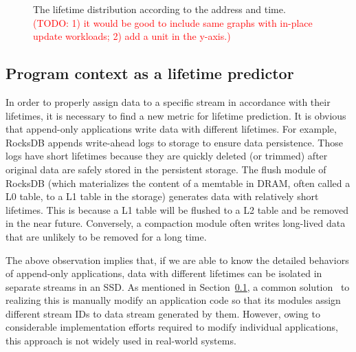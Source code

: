 \begin{figure}[t]
	\centering
	\vspace{-10pt}
	\caption{
		The lifetime distribution according to the address and time.
		\textcolor{red}{(TODO: 1) it would be good to include same graphs with
		in-place update workloads; 2) add a unit in the y-axis.)}}
		\label{fig:lba_lifetime}
	\vspace{-15pt}
\end{figure}

\subsection{Program context as a lifetime predictor}

In order to properly assign data to a specific stream in accordance with their
lifetimes, it is necessary to find a new metric for lifetime prediction.  It is
obvious that append-only applications write data with different lifetimes.  For
example, RocksDB appends write-ahead logs to storage to ensure data
persistence.  Those logs have short lifetimes because they are quickly deleted
(or trimmed) after original data are safely stored in the persistent storage.
The flush module of RocksDB (which materializes the content of a memtable in
DRAM, often called a L0 table, to a L1 table in the storage) generates data
with relatively short lifetimes. This is because a L1 table will be flushed to
a L2 table and be removed in the near future. Conversely, a compaction module
often writes long-lived data that are unlikely to be removed for a long time.

The above observation implies that, if we are able to know the detailed
behaviors of append-only applications, data with different lifetimes can be
isolated in separate streams in an SSD. As mentioned in Section~\ref{}, a
common solution~\cite{MultiStream} to realizing this is manually modify an
application code so that its modules assign different stream IDs to data stream
generated by them.  However, owing to considerable implementation efforts
required to modify individual applications, this approach is not widely used in
real-world systems.

